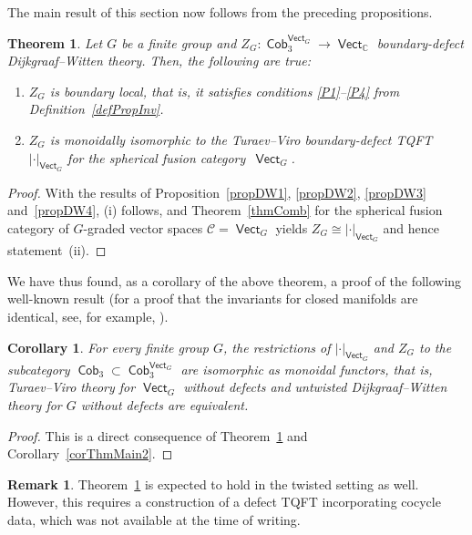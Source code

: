 \documentclass[pdftex]{sigma}
\DeclareMathOperator{\vect}{\mathsf{Vect}}
\DeclareMathOperator{\C}{\mathbb{C}}
\DeclareMathOperator{\Cob}{\mathsf{Cob}}
\numberwithin{equation}{section}
\newtheorem{Theorem}{Theorem}[section]
\newtheorem{Corollary}[Corollary]{Corollary}
\theoremstyle{definition}
\newtheorem{Remark}[Remark]{Remark}
\begin{document}
The main result of this section now follows from the preceding propositions.
\begin{Theorem}
 \label{thmDW}
 Let $G$ be a finite group and $Z_G\colon \Cob_3^{\vect_G} \rightarrow \vect_{\C}$ boundary-defect Dijkgraaf--Witten theory. Then, the following are true:
 \begin{enumerate}[$(i)$]\itemsep=0pt
 \item $Z_G$ is boundary local, that is, it satisfies conditions {\rm \ref{P1}--\ref{P4}} from Definition~{\rm \ref{defPropInv}}.
 \item $Z_G$ is monoidally isomorphic to the Turaev--Viro boundary-defect TQFT $|\cdot|_{\vect_G}$ for the spherical fusion category~$\vect_G$.
 \end{enumerate}
\end{Theorem}
\begin{proof}
 With the results of Proposition~\ref{propDW1}, \ref{propDW2}, \ref{propDW3} and~\ref{propDW4}, (i) follows, and Theorem~\ref{thmComb} for the spherical fusion category of $G$-graded vector spaces $\mathcal{C} = \vect_G$ yields $Z_G \cong |\cdot|_{\vect_G}$ and hence statement~(ii).
\end{proof}

We have thus found, as a corollary of the above theorem, a proof of the following well-known result (for a proof that the invariants for closed manifolds are identical, see, for example, \cite[Theorem~H.1]{TV}).
\begin{Corollary}\label{corDW}
For every finite group $G$, the restrictions of $|\cdot|_{\vect_G}$ and $Z_G$ to the subcategory $\Cob_3 \subset \Cob_3^{\vect_G}$ are isomorphic as monoidal functors, that is, Turaev--Viro theory for $\vect_G$ without defects and untwisted Dijkgraaf--Witten theory for $G$ without defects are equivalent.
\end{Corollary}
\begin{proof}
 This is a direct consequence of Theorem~\ref{thmDW} and Corollary~\ref{corThmMain2}.
\end{proof}

\begin{Remark}
Theorem~\ref{thmDW} is expected to hold in the twisted setting as well. However, this requires a construction of a defect TQFT incorporating cocycle data, which was not available at the time of writing.
\end{Remark}
\end{document}
